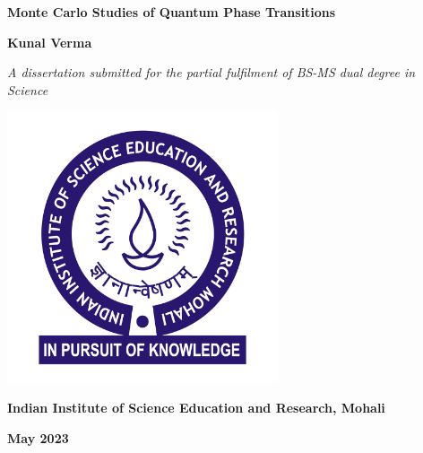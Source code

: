 \documentclass[a4paper,12pt]{report}
\numberwithin{equation}{section}
\begin{document}
\begin{titlepage}

  \begin{center}
  
      \vspace*{0.5cm}
      
      \LARGE
      \textbf{Monte Carlo Studies of Quantum Phase Transitions}
  
      \vspace{2cm}
      \Large
      \textbf{Kunal Verma}
      \vspace{1cm}
      
      \large
      \textit{A dissertation submitted for the partial fulfilment of
      BS-MS dual degree in Science}
      
      \vspace{1cm}
  
      \includegraphics[width=8cm]{images/HighResolutionLogo.jpg}
  
      \vspace{1cm}

      \large
      \textbf{Indian Institute of Science Education and Research, Mohali}\\
      \large
      
      \vspace{1cm}
      
      \textbf{May 2023}
  \end{center}
\end{titlepage}
  
\end{document}

